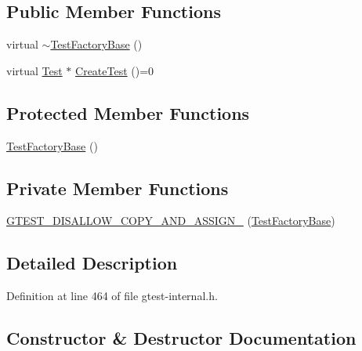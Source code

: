 \subsection*{Public Member Functions}
\begin{DoxyCompactItemize}
\item 
virtual \hyperlink{classtesting_1_1internal_1_1TestFactoryBase_a18f22a7594336a36642289c1decddc9e}{$\sim$\+Test\+Factory\+Base} ()
\item 
virtual \hyperlink{classtesting_1_1Test}{Test} $\ast$ \hyperlink{classtesting_1_1internal_1_1TestFactoryBase_a07ac3ca0b196cdb092da0bb186b7c030}{Create\+Test} ()=0
\end{DoxyCompactItemize}
\subsection*{Protected Member Functions}
\begin{DoxyCompactItemize}
\item 
\hyperlink{classtesting_1_1internal_1_1TestFactoryBase_afedbf147b2a213517b315880d8c81427}{Test\+Factory\+Base} ()
\end{DoxyCompactItemize}
\subsection*{Private Member Functions}
\begin{DoxyCompactItemize}
\item 
\hyperlink{classtesting_1_1internal_1_1TestFactoryBase_a85d7cb90e00f165e61a008be77293fb4}{G\+T\+E\+S\+T\+\_\+\+D\+I\+S\+A\+L\+L\+O\+W\+\_\+\+C\+O\+P\+Y\+\_\+\+A\+N\+D\+\_\+\+A\+S\+S\+I\+G\+N\+\_\+} (\hyperlink{classtesting_1_1internal_1_1TestFactoryBase}{Test\+Factory\+Base})
\end{DoxyCompactItemize}


\subsection{Detailed Description}


Definition at line 464 of file gtest-\/internal.\+h.



\subsection{Constructor \& Destructor Documentation}
\mbox{\label{classtesting_1_1internal_1_1TestFactoryBase_a18f22a7594336a36642289c1decddc9e}} 
